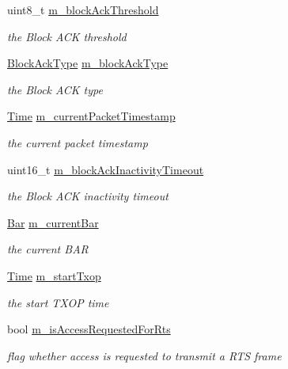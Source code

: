 \begin{DoxyCompactItemize}
uint8\+\_\+t \hyperlink{classns3_1_1EdcaTxopN_a158bbee5ed109f1e17927188053ea05a}{m\+\_\+block\+Ack\+Threshold}
\begin{DoxyCompactList}\small\item\em the Block A\+CK threshold \end{DoxyCompactList}\item 
\hyperlink{namespacens3_a90f436472d19d7d7f37cbf0b8c288ff7}{Block\+Ack\+Type} \hyperlink{classns3_1_1EdcaTxopN_a40f224c6cb6c7470553d28b2f04c429d}{m\+\_\+block\+Ack\+Type}
\begin{DoxyCompactList}\small\item\em the Block A\+CK type \end{DoxyCompactList}\item 
\hyperlink{classns3_1_1Time}{Time} \hyperlink{classns3_1_1EdcaTxopN_ad93008b9d802a1c1b007744f0d4f1a73}{m\+\_\+current\+Packet\+Timestamp}
\begin{DoxyCompactList}\small\item\em the current packet timestamp \end{DoxyCompactList}\item 
uint16\+\_\+t \hyperlink{classns3_1_1EdcaTxopN_a0f4087f940a73110911420a41ded5ce5}{m\+\_\+block\+Ack\+Inactivity\+Timeout}
\begin{DoxyCompactList}\small\item\em the Block A\+CK inactivity timeout \end{DoxyCompactList}\item 
\hyperlink{structns3_1_1Bar}{Bar} \hyperlink{classns3_1_1EdcaTxopN_a8500ea69876682da40eab4222b7066c5}{m\+\_\+current\+Bar}
\begin{DoxyCompactList}\small\item\em the current B\+AR \end{DoxyCompactList}\item 
\hyperlink{classns3_1_1Time}{Time} \hyperlink{classns3_1_1EdcaTxopN_a09db5c98febe1b5ecd67574518c67b2a}{m\+\_\+start\+Txop}
\begin{DoxyCompactList}\small\item\em the start T\+X\+OP time \end{DoxyCompactList}\item 
bool \hyperlink{classns3_1_1EdcaTxopN_a2dbb9cad85e4871b031dc1169c88bb08}{m\+\_\+is\+Access\+Requested\+For\+Rts}
\begin{DoxyCompactList}\small\item\em flag whether access is requested to transmit a R\+TS frame \end{DoxyCompactList}\item 

\end{DoxyCompactItemize}
